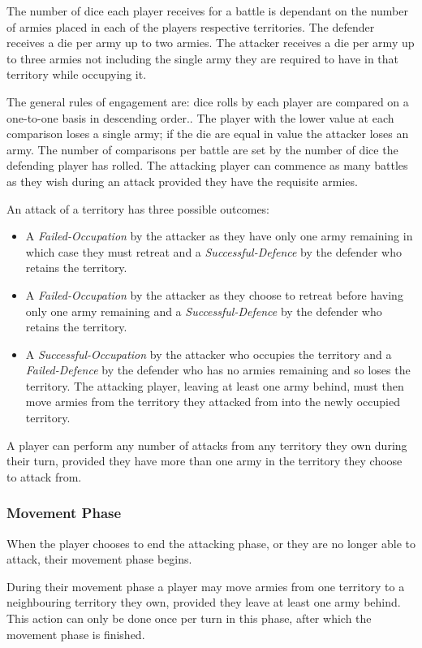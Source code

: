 \documentclass[parskip]{cs4rep}
\begin{document}
The number of dice each player receives for a battle is dependant on the number of armies placed in each of the players respective territories. The defender receives a die per army up to two armies. The attacker receives a die per army up to three armies not including the single army they are required to have in that territory while occupying it. 

The general rules of engagement are: dice rolls by each player are compared on a one-to-one basis in descending order.. The player with the lower value at each comparison loses a single army; if the die are equal in value the attacker loses an army. The number of comparisons per battle are set by the number of dice the defending player has rolled. The attacking player can commence as many battles as they wish during an attack provided they have the requisite armies.

An attack of a territory has three possible outcomes:

\begin{itemize}
\item
A \textit{Failed-Occupation} by the attacker as they have only one army remaining in which case they must retreat and a \textit{Successful-Defence} by the defender who retains the territory.
\item
A \textit{Failed-Occupation} by the attacker as they choose to retreat before having only one army remaining and a \textit{Successful-Defence} by the defender who retains the territory.
\item
A \textit{Successful-Occupation} by the attacker who occupies the territory and a \textit{Failed-Defence} by the defender who has no armies remaining and so loses the territory. The attacking player, leaving at least one army behind, must then move armies from the territory they attacked from into the newly occupied territory.
\end{itemize}

A player can perform any number of attacks from any territory they own during their turn, provided they have more than one army in the territory they choose to attack from.

\subsubsection{Movement Phase}

When the player chooses to end the attacking phase, or they are no longer able to attack, their movement phase begins.

During their movement phase a player may move armies from one territory to a neighbouring territory they own, provided they leave at least one army behind. This action can only be done once per turn in this phase, after which the movement phase is finished.
\end{document}
